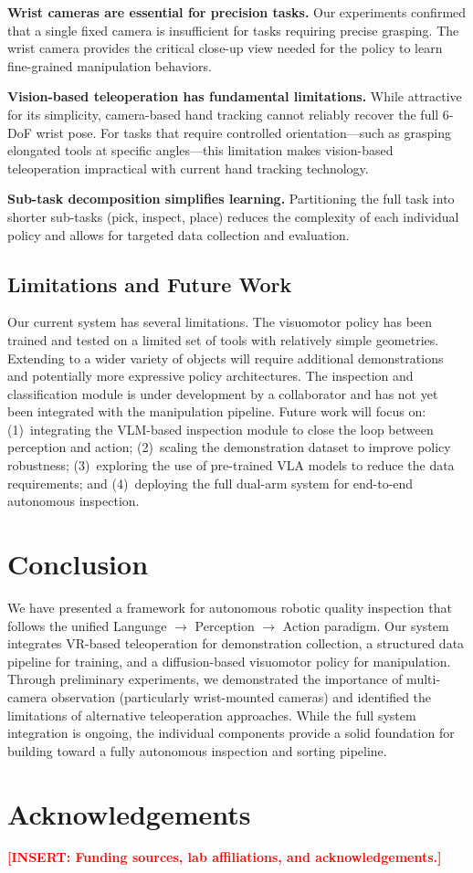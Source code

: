 \documentclass[conference]{IEEEtran}
\newcommand{\placeholder}[1]{\textcolor{red}{\textbf{[#1]}}}
\begin{document}
\textbf{Wrist cameras are essential for precision tasks.} Our experiments confirmed that a single fixed camera is insufficient for tasks requiring precise grasping. The wrist camera provides the critical close-up view needed for the policy to learn fine-grained manipulation behaviors.

\textbf{Vision-based teleoperation has fundamental limitations.} While attractive for its simplicity, camera-based hand tracking cannot reliably recover the full 6-DoF wrist pose. For tasks that require controlled orientation---such as grasping elongated tools at specific angles---this limitation makes vision-based teleoperation impractical with current hand tracking technology.

\textbf{Sub-task decomposition simplifies learning.} Partitioning the full task into shorter sub-tasks (pick, inspect, place) reduces the complexity of each individual policy and allows for targeted data collection and evaluation.

\subsection{Limitations and Future Work}

Our current system has several limitations. The visuomotor policy has been trained and tested on a limited set of tools with relatively simple geometries. Extending to a wider variety of objects will require additional demonstrations and potentially more expressive policy architectures. The inspection and classification module is under development by a collaborator and has not yet been integrated with the manipulation pipeline. Future work will focus on: (1)~integrating the VLM-based inspection module to close the loop between perception and action; (2)~scaling the demonstration dataset to improve policy robustness; (3)~exploring the use of pre-trained VLA models \cite{kim2024openvla, black2024pi0} to reduce the data requirements; and (4)~deploying the full dual-arm system for end-to-end autonomous inspection.

\section{Conclusion}

We have presented a framework for autonomous robotic quality inspection that follows the unified Language $\rightarrow$ Perception $\rightarrow$ Action paradigm. Our system integrates VR-based teleoperation for demonstration collection, a structured data pipeline for training, and a diffusion-based visuomotor policy for manipulation. Through preliminary experiments, we demonstrated the importance of multi-camera observation (particularly wrist-mounted cameras) and identified the limitations of alternative teleoperation approaches. While the full system integration is ongoing, the individual components provide a solid foundation for building toward a fully autonomous inspection and sorting pipeline.

\section*{Acknowledgements}

\placeholder{INSERT: Funding sources, lab affiliations, and acknowledgements.}



\end{document}
